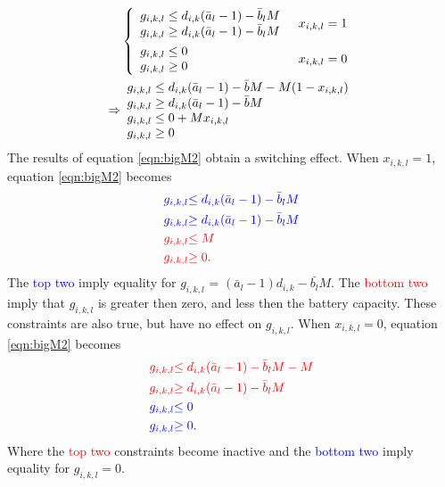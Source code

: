 \begin{equation}\label{eqn:bigM2}
 \begin{aligned} 
	 &\begin{dcases} 
		\begin{array}{l}
		g_{i,k,l} \le d_{i,k}(\bar{a}_l - 1) - \bar{b}_lM\\
		g_{i,k,l} \ge d_{i,k}(\bar{a}_l - 1) - \bar{b}_lM\\
		\end{array}
		& x_{i,k,l} = 1 \\
		\begin{array}{l}
		g_{i,k,l} \le 0 \\
		g_{i,k,l} \ge 0 \\
		\end{array} & x_{i,k,l} = 0\\ 
	\end{dcases} \\
	\Rightarrow & 
	 \begin{array}{l}
		 g_{i,k,l} \le d_{i,k}(\bar{a}_l - 1) - \bar{b}M - M(1 - x_{i,k,l})\\
		 g_{i,k,l} \ge d_{i,k}(\bar{a}_l - 1) - \bar{b}M\\
		 g_{i,k,l} \le 0 + Mx_{i,k,l} \\
		 g_{i,k,l} \ge 0 \\
	 \end{array}
\end{aligned}
\end{equation}
The results of equation \ref{eqn:bigM2} obtain a switching effect.  When $x_{i,k,l} = 1$, equation \ref{eqn:bigM2} becomes 
\begin{equation}
	\begin{aligned}
		\color{blue}{g_{i,k,l}}  &\color{blue}{\le d_{i,k}(\bar{a}_l - 1) - \bar{b}_lM} \\
		\color{blue}{g_{i,k,l}}  &\color{blue}{\ge d_{i,k}(\bar{a}_l - 1) - \bar{b}_lM} \\
		\color{red}{g_{i,k,l}} & \color{red}{\le M} \\
		\color{red}{g_{i,k,l}} & \color{red}{\ge 0}.  
	\end{aligned}
\end{equation}
The \textcolor{blue}{top two} imply equality for $g_{i,k,l}$ = $(\bar{a}_l - 1)d_{i,k} - \bar{b_l}M$.  The \textcolor{red}{bottom two} imply that $g_{i,k,l}$ is greater then zero, and less then the battery capacity.  These constraints are also true, but have no effect on $g_{i,k,l}$. When $x_{i,k,l} = 0$, equation \ref{eqn:bigM2} becomes
\begin{equation}
	\begin{aligned}
		\color{red}{g_{i,k,l}}  &\color{red}{\le d_{i,k}(\bar{a}_l - 1) - \bar{b}_lM - M} \\
		\color{red}{g_{i,k,l}}  &\color{red}{\ge d_{i,k}(\bar{a}_l - 1) - \bar{b}_lM} \\
		\color{blue}{g_{i,k,l}} &\color{blue}{\le 0} \\
		\color{blue}{g_{i,k,l}} &\color{blue}{\ge 0}.  
	\end{aligned}
\end{equation}
Where the \textcolor{red}{top two} constraints become inactive and the \textcolor{blue}{bottom two} imply equality for $g_{i,k,l} = 0$.

